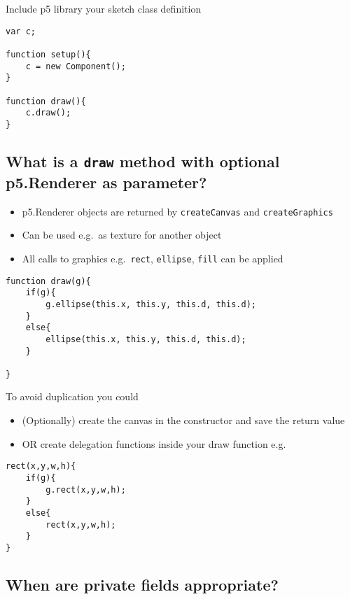 \documentclass{article}[18pt]
\providecommand{\tightlist}{%
	\setlength{\itemsep}{0pt}\setlength{\parskip}{0pt}}
\begin{document}
Include p5 library your sketch class definition

\begin{verbatim}
var c;

function setup(){
	c = new Component();
}

function draw(){
	c.draw();
}
\end{verbatim}

\hypertarget{what-is-a-draw-method-with-optional-p5.renderer-as-parameter}{%
	\subsection{\texorpdfstring{What is a \texttt{draw} method with optional
			p5.Renderer as
			parameter?}{What is a draw method with optional p5.Renderer as parameter?}}\label{what-is-a-draw-method-with-optional-p5.renderer-as-parameter}}

\begin{itemize}
	\tightlist
	\item
	p5.Renderer objects are returned by \texttt{createCanvas} and
	\texttt{createGraphics}
	\item
	Can be used e.g.~as texture for another object
	\item
	All calls to graphics e.g.~\texttt{rect}, \texttt{ellipse},
	\texttt{fill} can be applied
\end{itemize}

\begin{verbatim}
function draw(g){
	if(g){
		g.ellipse(this.x, this.y, this.d, this.d);
	}
	else{
		ellipse(this.x, this.y, this.d, this.d);
	}

}
\end{verbatim}

To avoid duplication you could

\begin{itemize}
	\tightlist
	\item
	(Optionally) create the canvas in the constructor and save the return
	value
	\item
	OR create delegation functions inside your draw function e.g.
\end{itemize}
\newpage
\begin{verbatim}
rect(x,y,w,h){
	if(g){
		g.rect(x,y,w,h);
	}
	else{
		rect(x,y,w,h);
	}
}
\end{verbatim}

\hypertarget{when-are-private-fields-appropriate}{%
	\subsection{When are private fields
		appropriate?}\label{when-are-private-fields-appropriate}}
\end{document}
